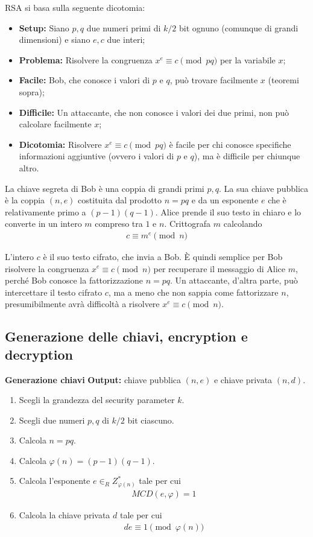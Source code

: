 \noindent RSA si basa sulla seguente dicotomia:
\begin{itemize}
    \item \textbf{Setup:} Siano $p, q$ due numeri primi di $k/2$ bit ognuno (comunque di grandi dimensioni) e siano $e, c$ due interi;
    \item \textbf{Problema:} Risolvere la congruenza $x^e \equiv c \pmod{pq}$ per la variabile $x$;
    \item \textbf{Facile:} Bob, che conosce i valori di $p$ e $q$, può trovare facilmente $x$ (teoremi sopra);
    \item \textbf{Difficile:} Un attaccante, che non conosce i valori dei due primi, non può calcolare facilmente $x$;
    \item \textbf{Dicotomia:} Risolvere $x^e \equiv c \pmod{pq}$ è facile per chi conosce specifiche informazioni aggiuntive (ovvero i valori di $p$ e $q$), ma è difficile per chiunque altro.
\end{itemize}

\noindent La chiave segreta di Bob è una coppia di grandi primi $p,q$. La sua chiave pubblica è la coppia $(n, e)$ costituita dal prodotto $n= pq$ e da un esponente $e$ che è relativamente primo a $(p - 1)(q - 1)$. Alice prende il suo testo in chiaro e lo converte in un intero $m$ compreso tra $1$ e $n$. Crittografa $m$ calcolando
\begin{align*}
    c \equiv m^e \pmod n
\end{align*}

\noindent L'intero $c$ è il suo testo cifrato, che invia a Bob. È quindi semplice per Bob risolvere la congruenza $x^e \equiv c \pmod n$ per recuperare il messaggio di Alice $m$, perché Bob conosce la fattorizzazione $n = pq$. Un attaccante, d'altra parte, può intercettare il testo cifrato $c$, ma a meno che non sappia come fattorizzare $n$, presumibilmente avrà difficoltà a risolvere $x^e \equiv c \pmod n$.

\subsection{Generazione delle chiavi, encryption e decryption}

\textbf{Generazione chiavi}
\noindent \textbf{Output:} chiave pubblica $(n, e)$ e chiave privata $(n, d)$.
\begin{enumerate}
    \item Scegli la grandezza del security parameter $k$.
    \item Scegli due numeri $p, q$ di $k/2$ bit ciascuno.
    \item Calcola $n = pq$.
    \item Calcola $\varphi(n) = (p-1)(q-1)$.
    \item Calcola l'esponente $e \in_R Z_{\varphi(n)}^*$ tale per cui
    \begin{align*}
        MCD(e, \varphi) = 1
    \end{align*}
    \item Calcola la chiave privata $d$ tale per cui
    \begin{align*}
        de \equiv 1 \pmod{\varphi(n)}
    \end{align*}
\end{enumerate}

